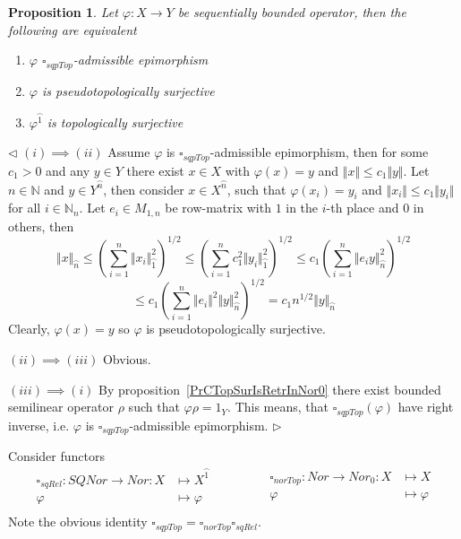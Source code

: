 \documentclass[12pt]{article}
\newtheorem{proposition}[theorem]{Proposition}
\newenvironment{proof}{\par $\triangleleft$}{$\triangleright$}
\begin{document}
\begin{proposition}\label{PrDecsPsTopAdmEpiMorph} Let $\varphi:X\to Y$ be 
sequentially bounded operator, then the following are equivalent

\begin{enumerate}[label = (\roman*)]
    \item $\varphi$ $\square_{sqpTop}$-admissible epimorphism

    \item $\varphi$ is pseudotopologically surjective

    \item $\varphi^{\wideparen{1}}$ is topologically surjective
\end{enumerate}
\end{proposition}
\begin{proof}
$(i)\implies (ii)$ Assume $\varphi$ is $\square_{sqpTop}$-admissible epimorphism, 
then for some $c_1>0$ and any $y\in Y$ there exist $x\in X$ 
with $\varphi(x)=y$ and $\Vert x\Vert\leq c_1\Vert y\Vert$. 
Let $n\in\mathbb{N}$ and $y\in Y^{\wideparen{n}}$, then 
consider $x\in X^{\wideparen{n}}$, such that $\varphi(x_i)=y_i$ 
and $\Vert x_i\Vert\leq c_1\Vert y_i\Vert$ for all $i\in\mathbb{N}_n$. 
Let $e_i\in M_{1,n}$ be row-matrix with $1$ in the $i$-th place 
and $0$ in others, then 
$$
\Vert x\Vert_{\wideparen{n}} 
\leq  {\left(\sum\limits_{i=1}^n\Vert x_i\Vert_{\wideparen{1}}^2\right)}^{1/2} 
\leq  {\left(\sum\limits_{i=1}^n c_1^2
\Vert y_i\Vert_{\wideparen{1}}^2\right)}^{1/2} 
\leq
c_1{\left(\sum\limits_{i=1}^n\Vert e_i y\Vert_{\wideparen{n}}^2\right)}^{1/2}
$$
$$
\leq c_1{\left(\sum\limits_{i=1}^n\Vert e_i\Vert^2 \Vert
y\Vert_{\wideparen{n}}^2\right)}^{1/2} =c_1n^{1/2}\Vert y\Vert_{\wideparen{n}}
$$
Clearly, $\varphi(x)=y$ so $\varphi$ is pseudotopologically surjective.

$(ii)\implies (iii)$ Obvious.

$(iii)\implies (i)$ By proposition~\ref{PrCTopSurIsRetrInNor0} 
there exist bounded semilinear operator $\rho$ such that 
$\varphi\rho=1_Y$. This means, that $\square_{sqpTop}(\varphi)$ 
have right inverse, i.e. $\varphi$ 
is $\square_{sqpTop}$-admissible epimorphism. 
\end{proof}

Consider functors
$$
\begin{aligned}
\square_{sqRel} : SQNor \to Nor: X &\mapsto X^{\wideparen{1}}\\
\varphi&\mapsto\varphi \\
\end{aligned}
\qquad\qquad
\begin{aligned}
\square_{norTop} : Nor \to Nor_0: X &\mapsto X\\
\varphi&\mapsto\varphi \\
\end{aligned}
$$
Note the obvious identity $\square_{sqpTop}=\square_{norTop}\square_{sqRel}$.
\end{document}
